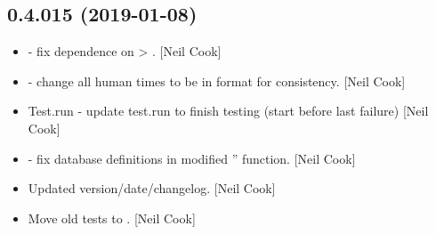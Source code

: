 \documentclass[a4paper,10pt,english]{report}
\begin{document}
\subsection{0.4.015 (2019-01-08)}
\label{\detokenize{misc/changelog:id222}}\begin{itemize}
\item {} 
 - fix dependence on  \textendash{}\textgreater{} .
{[}Neil Cook{]}

\item {} 
 - change all human times to be in format
 for consistency. {[}Neil Cook{]}

\item {} 
Test.run - update test.run to finish testing (start before last
failure) {[}Neil Cook{]}

\item {} 
 - fix database definitions in modified ”
function. {[}Neil Cook{]}

\item {} 
Updated version/date/changelog. {[}Neil Cook{]}

\item {} 
Move old tests to . {[}Neil Cook{]}

\end{itemize}
\end{document}
